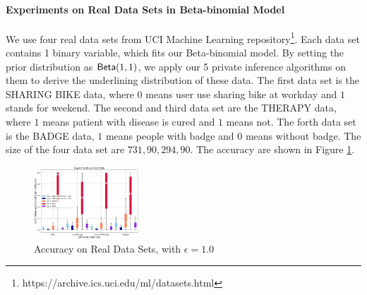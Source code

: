\documentclass{article}
\begin{document}


\paragraph{Experiments on Real Data Sets in Beta-binomial Model}
We use four real data sets from UCI Machine Learning repository\footnote{https://archive.ics.uci.edu/ml/datasets.html}. Each data set contains 1 binary variable, which fits our Beta-binomial model. By setting the prior distribution as $\mathsf{Beta}(1,1)$, we apply our 5 private inference algorithms on them to derive the underlining distribution of these data. The first data set is the SHARING BIKE data, where $0$ means user use sharing bike at workday and $1$ stands for weekend. The second and third data set are the THERAPY data, where $1$ means patient with disease is cured and $1$ means not. The forth data set is the BADGE data, $1$ means people with badge and $0$ means without badge. The size of the four data set are $731, 90, 294, 90$. The accuracy are shown in Figure \ref{fig_real_2d}.
\begin{figure}
\centering
\includegraphics[width=0.35\textwidth]{realdata.eps}
\caption{Accuracy on Real Data Sets, with $\epsilon = 1.0$}
\label{fig_real_2d}
\end{figure}
\end{document}
